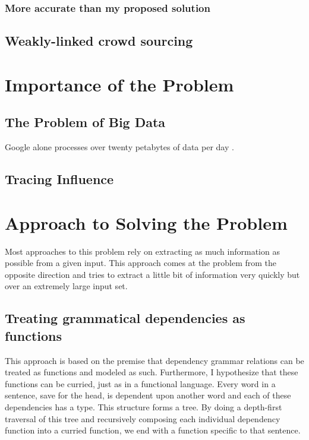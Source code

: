 \documentclass[11pt]{article}
\begin{document}
\subsubsection{More accurate than my proposed solution}

\subsection{Weakly-linked crowd sourcing}

\section{Importance of the Problem}

\subsection{The Problem of Big Data}

Google alone processes over twenty petabytes of data per day \citep{Dean:2008:MSD:1327452.1327492}.

\subsection{Tracing Influence}


\section{Approach to Solving the Problem}

Most approaches to this problem rely on extracting as much information as possible from a given input.  This approach comes at the problem from the opposite direction and tries to extract a little bit of information very quickly but over an extremely large input set.  

\subsection{Treating grammatical dependencies as functions}

This approach is based on the premise that dependency grammar relations can be treated as functions and modeled as such.  Furthermore, I hypothesize that these functions can be curried, just as in a functional language.  Every word in a sentence, save for the head, is dependent upon another word and each of these dependencies has a type.  This structure forms a tree.  By doing a depth-first traversal of this tree and recursively composing each individual dependency function into a curried function, we end with a function specific to that sentence.
\end{document}

